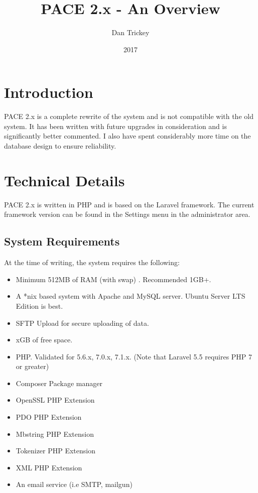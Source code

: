 \documentclass{article}
\title{PACE 2.x - An Overview}
\date{2017}
\author{Dan Trickey}
\begin{document}
	
\maketitle
{}
\newpage

\tableofcontents
\newpage


\section{Introduction}
PACE 2.x is a complete rewrite of the system and is not compatible with the old system. It has been written with future upgrades in consideration and is significantly better commented. I also have spent considerably more time on the database design to ensure reliability.

\section{Technical Details}

PACE 2.x is written in PHP and is based on the Laravel framework. The current framework version can be found in the Settings menu in the administrator area. 

\subsection{System Requirements}

At the time of writing, the system requires the following:

\begin{itemize}
	
	\item Minimum 512MB of RAM (with swap) . Recommended 1GB+. 
	\item A *nix based system with Apache and MySQL server. Ubuntu Server LTS Edition is best.
	\item SFTP Upload for secure uploading of data.
	\item xGB of free space.
	\item PHP. Validated for 5.6.x, 7.0.x, 7.1.x. (Note that Laravel 5.5 requires PHP 7 or greater)
	\item Composer Package manager
	\item OpenSSL PHP Extension
	\item PDO PHP Extension
	\item Mbstring PHP Extension
	\item Tokenizer PHP Extension
	\item XML PHP Extension
	\item An email service (i.e SMTP, mailgun)

\end{itemize}
\end{document}
